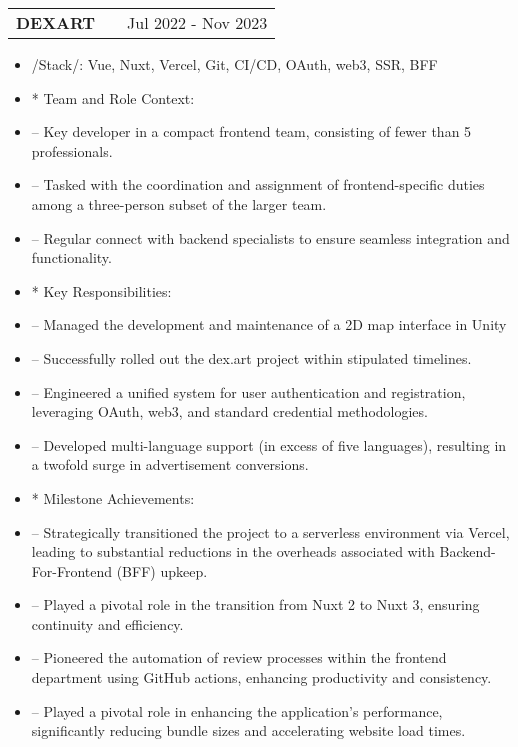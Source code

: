 \documentclass[a4paper,12pt]{article}
\makeatletter
\newenvironment{joblong}[2]
    {
    \begin{tabularx}{\linewidth}{@{}l X r@{}}
    \textbf{#1} & \hfill &  #2 \\[3.75pt]
    \end{tabularx}
    \begin{minipage}[t]{\linewidth}
    \begin{itemize}[nosep,after=\strut, leftmargin=1em, itemsep=3pt,label=--]
    }
    {
    \end{itemize}
    \end{minipage}    
    }
\makeatother
\begin{document}
\begin{joblong}{DEXART}{Jul 2022 - Nov 2023}
  \item /Stack/: {Vue, Nuxt, Vercel, Git, CI/CD, OAuth, web3, SSR, BFF}
  
  \item [*] Team and Role Context:
  \item [--] Key developer in a compact frontend team, consisting of fewer than 5 professionals. 
  \item [--] Tasked with the coordination and assignment of frontend-specific duties among a three-person subset of the larger team.
  \item [--] Regular connect with backend specialists to ensure seamless integration and functionality.

  \item [*] Key Responsibilities:
  \item [--] Managed the development and maintenance of a 2D map interface in Unity
  \item [--] Successfully rolled out the dex.art project within stipulated timelines.
  \item [--] Engineered a unified system for user authentication and registration, leveraging OAuth, web3, and standard credential methodologies.
  \item [--] Developed multi-language support (in excess of five languages), resulting in a twofold surge in advertisement conversions.

  \item [*] Milestone Achievements:
  \item [--] Strategically transitioned the project to a serverless environment via Vercel, leading to substantial reductions in the overheads associated with Backend-For-Frontend (BFF) upkeep.
  \item [--] Played a pivotal role in the transition from Nuxt 2 to Nuxt 3, ensuring continuity and efficiency.
  \item [--] Pioneered the automation of review processes within the frontend department using GitHub actions, enhancing productivity and consistency.
  \item [--] Played a pivotal role in enhancing the application's performance, significantly reducing bundle sizes and accelerating website load times.

\end{joblong}

\newpage
\end{document}
